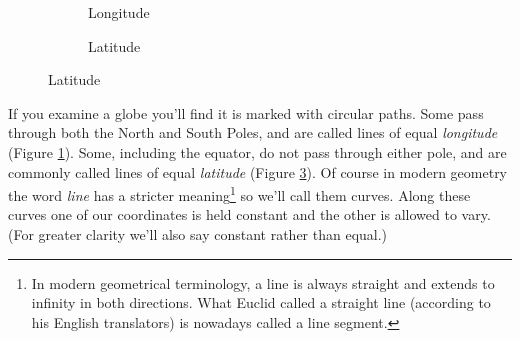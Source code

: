 \begin{figure}[h]
\begin{subfigure}{0.5\textwidth}
\begin{tikzpicture}[tdplot_main_coords, scale = 2]
        \end{tikzpicture}
        \caption{Longitude} \label{fig:globe-longitude}
    \end{subfigure}
    \begin{subfigure}{0.5\textwidth}
        \centering
    \caption{Latitude} \label{fig:globe-latitude}
    \end{subfigure}
\end{figure}

If you examine a globe you'll find it is marked with circular paths. Some pass through both the North and South Poles, and are called lines of equal \textit{longitude} (Figure \ref{fig:globe-longitude}). Some, including the equator, do not pass through either pole, and are commonly called lines of equal \textit{latitude} (Figure \ref{fig:globe-latitude}). Of course in modern geometry the word \textit{line} has a stricter meaning\footnote{In modern geometrical terminology, a line is always straight and extends to infinity in both directions. What Euclid called a straight line (according to his English translators) is nowadays called a line segment.} so we'll call them curves. Along these curves one of our coordinates is held constant and the other is allowed to vary. (For greater clarity we'll also say constant rather than equal.)

